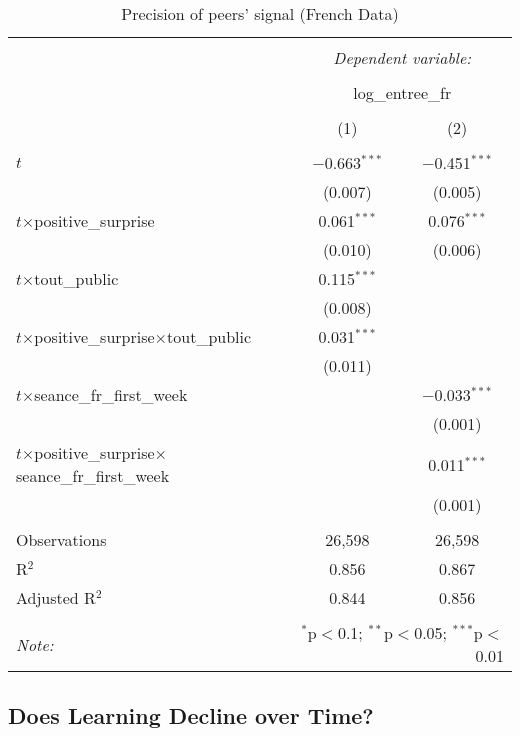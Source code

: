 \begin{table}[!htbp] \centering 
	\caption{Precision of peers' signal (French Data)} 
  \label{precisionsignal} 
\begin{tabular}{@{\extracolsep{0pt}}lcc} 
\\[-1.8ex]\hline 
\hline \\[-1.8ex] 
 & \multicolumn{2}{c}{\textit{Dependent variable:}} \\ 
\cline{2-3} 
\\[-1.8ex] & \multicolumn{2}{c}{log\_entree\_fr} \\ 
\\[-1.8ex] & (1) & (2)\\ 
\hline \\[-1.8ex] 
 $t$ & $-$0.663$^{***}$ & $-$0.451$^{***}$ \\ 
  & (0.007) & (0.005) \\ 
 $t$$\times$positive\_surprise & 0.061$^{***}$ & 0.076$^{***}$ \\ 
  & (0.010) & (0.006) \\ 
 $t$$\times$tout\_public & 0.115$^{***}$ &  \\ 
  & (0.008) &  \\ 
 $t$$\times$positive\_surprise$\times$tout\_public & 0.031$^{***}$ &  \\ 
  & (0.011) &  \\ 
 $t$$\times$seance\_fr\_first\_week &  & $-$0.033$^{***}$ \\ 
  &  & (0.001) \\ 
 $t$$\times$positive\_surprise$\times$seance\_fr\_first\_week &  & 0.011$^{***}$ \\ 
  &  & (0.001) \\ 
\hline \\[-1.8ex] 
Observations & 26,598 & 26,598 \\ 
R$^{2}$ & 0.856 & 0.867 \\ 
Adjusted R$^{2}$ & 0.844 & 0.856 \\ 
\hline 
\hline \\[-1.8ex] 
\textit{Note:}  & \multicolumn{2}{r}{$^{*}$p$<$0.1; $^{**}$p$<$0.05; $^{***}$p$<$0.01} \\ 
\end{tabular} 
\end{table}

\subsection{Does Learning Decline over Time?}\label{subsec2.5}

